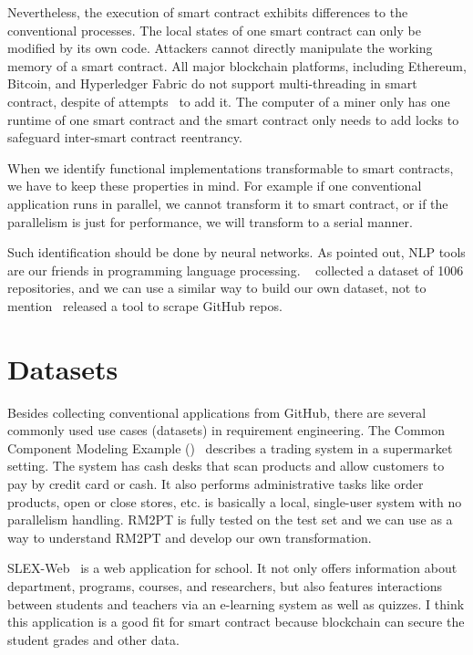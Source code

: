Nevertheless, the execution of smart contract exhibits differences to the conventional processes.
The local states of one smart contract can only be modified by its own code. Attackers cannot directly manipulate the working memory of a smart contract.
All major blockchain platforms, including Ethereum, Bitcoin, and Hyperledger Fabric do not support multi-threading in smart contract, despite of attempts~\cite{anjana2019efficient,yu2018parallel} to add it. The computer of a miner only has one runtime of one smart contract and the smart contract only needs to add locks to safeguard inter-smart contract reentrancy.

When we identify functional implementations transformable to smart contracts, we have to keep these properties in mind. For example if one conventional application runs in parallel, we cannot transform it to smart contract, or if the parallelism is just for performance, we will transform to a serial manner.

Such identification should be done by neural networks. As  pointed out, NLP tools are our friends in programming language processing.
~\cite{jiang2017} collected a dataset of \num{1006} repositories,
and we can use a similar way to build our own dataset, not to mention~\cite{alexandru2017replicating} released a tool to scrape GitHub repos.




\section{Datasets}
Besides collecting conventional applications from GitHub,
there are several commonly used use cases (datasets) in requirement engineering.
The Common Component Modeling Example (\cocome)~\cite{herold2008cocome} describes a trading system in a supermarket setting.
The system has cash desks that scan products and allow customers to pay by credit card or cash. It also performs administrative tasks like order products, open or close stores, etc.
{\cocome} is basically a local, single-user system with no parallelism handling.
RM2PT is fully tested on the {\cocome} test set and we can use {\cocome} as a way to understand RM2PT and develop our own transformation.

SLEX-Web~\cite{jantan2012extension} is a web application for school. It not only offers information about department, programs, courses, and researchers, but also features interactions between students and teachers via an e-learning system as well as quizzes.
I think this application is a good fit for smart contract because blockchain can secure the student grades and other data.


